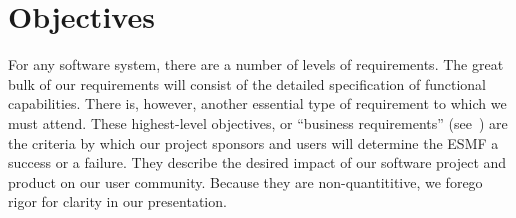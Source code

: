\section{Objectives}

For any software system, there are a number of levels of requirements.
The great bulk of our requirements will consist of the detailed
specification of functional capabilities.  There is, however,
another essential type of requirement to which we must attend.  These 
highest-level objectives, or ``business requirements'' (see~\cite{wiegers}) 
are the criteria by which our project sponsors and users will determine the 
ESMF a success or a failure.  They describe the desired impact of our 
software project and product on our user community.  Because they are 
non-quantititive, we forego rigor for clarity in our presentation.

